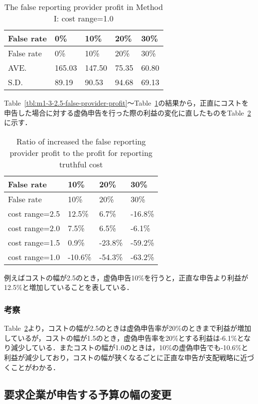 \hypertarget{tbl:m1-3-1.0-false-provider-profit}{}
\begin{longtable}[H]{@{}lllll@{}}
\caption{\label{tbl:m1-3-1.0-false-provider-profit}The false reporting
provider profit in Method I: cost range=1.0}\tabularnewline
\toprule
False rate & 0\% & 10\% & 20\% & 30\%\tabularnewline
\midrule
\endfirsthead
\toprule
False rate & 0\% & 10\% & 20\% & 30\%\tabularnewline
\midrule
\endhead
AVE. & 165.03 & 147.50 & 75.35 & 60.80\tabularnewline
S.D. & 89.19 & 90.53 & 94.68 & 69.13\tabularnewline
\bottomrule
\end{longtable}

Table~\ref{tbl:m1-3-2.5-false-provider-profit}〜Table~\ref{tbl:m1-3-1.0-false-provider-profit}の結果から，正直にコストを申告した場合に対する虚偽申告を行った際の利益の変化に直したものをTable~\ref{tbl:m1-3-profit-rate}に示す．

\hypertarget{tbl:m1-3-profit-rate}{}
\begin{longtable}[H]{@{}llll@{}}
\caption{\label{tbl:m1-3-profit-rate}Ratio of increased the false
reporting provider profit to the profit for reporting truthful
cost}\tabularnewline
\toprule
False rate & 10\% & 20\% & 30\%\tabularnewline
\midrule
\endfirsthead
\toprule
False rate & 10\% & 20\% & 30\%\tabularnewline
\midrule
\endhead
cost range=2.5 & 12.5\% & 6.7\% & -16.8\%\tabularnewline
cost range=2.0 & 7.5\% & 6.5\% & -6.1\%\tabularnewline
cost range=1.5 & 0.9\% & -23.8\% & -59.2\%\tabularnewline
cost range=1.0 & -10.6\% & -54.3\% & -63.2\%\tabularnewline
\bottomrule
\end{longtable}

例えばコストの幅が2.5のとき，虚偽申告10\%を行うと，正直な申告より利益が12.5\%と増加していることを表している．

\hypertarget{ux8003ux5bdf-2}{%
\subsubsection{考察}\label{ux8003ux5bdf-2}}

Table~\ref{tbl:m1-3-profit-rate}より，コストの幅が2.5のときは虚偽申告率が20\%のときまで利益が増加しているが，コストの幅が1.5のとき，虚偽申告率を20\%とする利益は-6.1\%となり減少している．またコストの幅が1.0のときは，10\%の虚偽申告でも-10.6\%と利益が減少しており，コストの幅が狭くなるごとに正直な申告が支配戦略に近づくことがわかる．

\hypertarget{ux8981ux6c42ux4f01ux696dux304cux7533ux544aux3059ux308bux4e88ux7b97ux306eux5e45ux306eux5909ux66f4}{%
\subsection{要求企業が申告する予算の幅の変更}\label{ux8981ux6c42ux4f01ux696dux304cux7533ux544aux3059ux308bux4e88ux7b97ux306eux5e45ux306eux5909ux66f4}}

